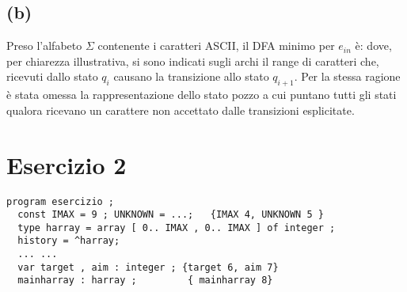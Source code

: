 \documentclass[a4paper,oneside,11pt]{article}
\begin{document}
\subsection*{(b)}
Preso l'alfabeto $\Sigma$ contenente i caratteri ASCII, il DFA minimo per $e_{in}$ è:
\label{dfa}
dove, per chiarezza illustrativa, si sono indicati sugli archi il range di caratteri che, ricevuti dallo stato $q_i$ causano la transizione allo stato $q_{i+1}$. Per la stessa ragione è stata omessa la rappresentazione dello stato pozzo a cui puntano tutti gli stati qualora ricevano un carattere non accettato dalle transizioni esplicitate.
\section*{Esercizio 2}
\begin{lstlisting}
program esercizio ;
  const IMAX = 9 ; UNKNOWN = ...;   {IMAX 4, UNKNOWN 5 }
  type harray = array [ 0.. IMAX , 0.. IMAX ] of integer ;
  history = ^harray;
  ... ...
  var target , aim : integer ; {target 6, aim 7}
  mainharray : harray ;         { mainharray 8}


\end{lstlisting}
\end{document}
